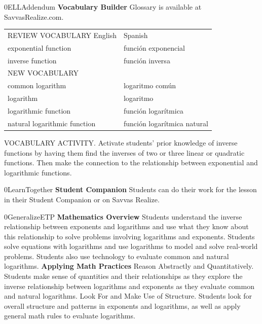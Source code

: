 \documentclass{article}
\newenvironment{te-addendum}[2]{}{}     %
\newcommand{\placeholder}[2]{}          %
\begin{document}
\begin{te-addendum}{0}{ELLAddendum}
\textbf{Vocabulary Builder}
Glossary is available at SavvasRealize.com.
\begin{tabular}{ll}
REVIEW VOCABULARY English & Spanish \\
exponential function & función exponencial \\
inverse function & función inversa \\
NEW VOCABULARY & \\
common logarithm & logaritmo común \\
logarithm & logaritmo \\
logarithmic function & función logarítmica \\
natural logarithmic function & función logarítmica natural \\
\end{tabular}
VOCABULARY ACTIVITY. Activate students' prior knowledge of inverse functions by having them find the inverses of two or three linear or quadratic functions. Then make the connection to the relationship between exponential and logarithmic functions.
\end{te-addendum}
\begin{te-addendum}{0}{LearnTogether}
\textbf{Student Companion}
Students can do their work for the lesson in their Student Companion or on Savvas Realize.
\placeholder{illustration}{Student Companion cover: luminous purple and blue circular design on black; Student Companion, enVision Algebra 2, SAVVAS.}
\end{te-addendum}
\begin{te-addendum}{0}{GeneralizeETP}
\textbf{Mathematics Overview}
Students understand the inverse relationship between exponents and logarithms and use what they know about this relationship to solve problems involving logarithms and exponents.
Students solve equations with logarithms and use logarithms to model and solve real-world problems. Students also use technology to evaluate common and natural logarithms.
\textbf{Applying Math Practices}
Reason Abstractly and Quantitatively. Students make sense of quantities and their relationships as they explore the inverse relationship between logarithms and exponents as they evaluate common and natural logarithms.
Look For and Make Use of Structure. Students look for overall structure and patterns in exponents and logarithms, as well as apply general math rules to evaluate logarithms.
\end{te-addendum}
\end{document}

